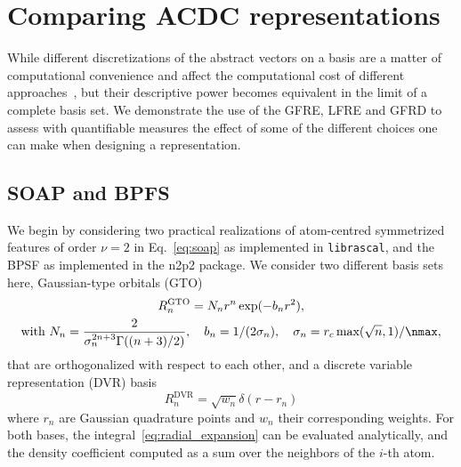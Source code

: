 \section{Comparing ACDC representations}

While different discretizations of the abstract vectors on a basis  are a matter of computational convenience and affect the computational cost of different approaches~\cite{zuo+20jpcl}, but their descriptive power becomes equivalent in the limit of a complete basis set. 
We demonstrate the use of the GFRE, LFRE and GFRD to assess with quantifiable measures the effect of some of the different choices one can make when designing a representation.

\subsection{SOAP and BPFS}
\label{sub:hypers}
We begin by considering two practical realizations of atom-centred symmetrized features of order $\nu=2$ in Eq.~\eqref{eq:soap} as implemented in \texttt{librascal}\cite{LIBRASCAL}, and the BPSF\cite{behl11jcp} as implemented in the n2p2 package\cite{singraber2019parallel}. 
We consider two different basis sets here, Gaussian-type orbitals (GTO)
\begin{subequations}
\begin{gather}
  R_n^\textrm{GTO} = N_n r^{n}\exp(-b_nr^2),\\
\text{with }N_n=\frac2{\sigma_n^{2n+3}\Gamma((n+3)/2)},\quad b_n = 1/(2\sigma_n),\quad \sigma_n = r_c\,\textrm{max}(\sqrt{n},1)/\nmax,
\end{gather}
\end{subequations}
that are orthogonalized with respect to each other,
and a discrete variable representation (DVR) basis
\begin{equation}
R_n^\textrm{DVR}= \sqrt{w_n}\delta(r-r_n)
\end{equation}
where $r_n$ are Gaussian quadrature points and $w_n$ their corresponding weights.
For both bases, the integral~\eqref{eq:radial_expansion} can be evaluated analytically, and the density coefficient computed as a sum over the neighbors of the $i$-th atom.


